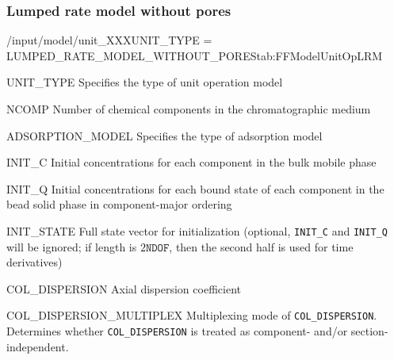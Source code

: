 \subsubsection{Lumped rate model without pores}

\begin{condsubgroup}{/input/model/unit\_XXX}{UNIT\_TYPE = LUMPED\_RATE\_MODEL\_WITHOUT\_PORES}{tab:FFModelUnitOpLRM}
  \begin{dataset}[type=string,range={\texttt{LUMPED\_RATE\_MODEL\_WITHOUT\_PORES}},length=1]{UNIT\_TYPE}
    Specifies the type of unit operation model
  \end{dataset}
  \begin{dataset}[type=int,range={$\geq 1$},length=1]{NCOMP}
    Number of chemical components in the chromatographic medium
  \end{dataset}
  \begin{dataset}[type=string,range={See Section~\ref{sec:FFAdsorption}},length=1]{ADSORPTION\_MODEL}
    Specifies the type of adsorption model
  \end{dataset}
  \begin{dataset}[unit=\si{\mol\per\cubic\metre\of{IV}},type=double,range={$\geq 0$},length={\texttt{NCOMP}}]{INIT\_C}
    Initial concentrations for each component in the bulk mobile phase
  \end{dataset}
  \begin{dataset}[unit=\si{\mol\per\cubic\metre\of{SP}},type=double,range={$\geq 0$},length={\texttt{NTOTALBND}}]{INIT\_Q}
    Initial concentrations for each bound state of each component in the bead solid phase in component-major ordering
  \end{dataset}
  \begin{dataset}[unit=various,type=double,range={$\mathds{R}$},length={\texttt{NDOF} / $2\texttt{NDOF}$}]{INIT\_STATE}
    Full state vector for initialization (optional, \texttt{INIT\_C} and \texttt{INIT\_Q} will be ignored; if length is $2\texttt{NDOF}$, then the second half is used for time derivatives)
  \end{dataset}
  \begin{dataset}[unit=\si{\square\metre\of{IV}\per\second},type=double,range={$\geq 0$},length={see \texttt{COL\_DISPERSION\_MULTIPLEX}}]{COL\_DISPERSION}
    Axial dispersion coefficient
  \end{dataset}
  \begin{dataset}[unit=--,type=int,range={$\{0, \dots, 3 \}$},length={1}]{COL\_DISPERSION\_MULTIPLEX}
    Multiplexing mode of \texttt{COL\_DISPERSION}.
    Determines whether \texttt{COL\_DISPERSION} is treated as component- and/or section-independent.


\end{dataset}
\end{condsubgroup}
